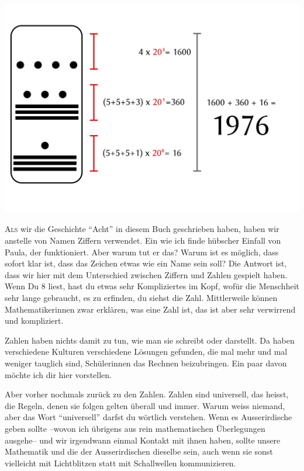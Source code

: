 ﻿
\thispagestyle{empty}
\begin{center}
\includegraphics[width=\textwidth]{./bilder/Maya1976.png}
\end{center}
\vspace*{\fill}
{\centering\fontsize{50}{48} \color{farbe}\par}
\newpage
\lettrine[lines=3, lhang=.2, loversize=.25, lraise=0.05, findent=0.1em,nindent=0em]{A}{ls} wir die Geschichte \enquote{Acht} in diesem Buch geschrieben haben, haben wir anstelle von Namen Ziffern verwendet. Ein wie ich finde hübscher Einfall von Paula, der funktioniert. Aber warum tut er das? Warum ist es möglich, dass sofort klar ist, dass das Zeichen  etwas wie ein Name sein soll? Die Antwort ist, dass wir hier mit dem Unterschied zwischen Ziffern und Zahlen gespielt haben. Wenn Du 8 liest, hast du etwas sehr Kompliziertes im Kopf, wofür die Menschheit sehr lange gebraucht, es zu erfinden, du siehst die Zahl. Mittlerweile können Mathematikerinnen zwar erklären, was eine Zahl ist, das ist aber sehr verwirrend und kompliziert.

Zahlen haben nichts damit zu tun, wie man sie schreibt oder darstellt. Da haben verschiedene Kulturen verschiedene Lösungen gefunden, die mal mehr und mal weniger tauglich sind, Schülerinnen das Rechnen beizubringen. Ein paar davon möchte ich dir hier vorstellen.

Aber vorher nochmals zurück zu den Zahlen. Zahlen sind universell, das heisst, die Regeln, denen sie folgen gelten überall und immer. Warum weiss niemand, aber das Wort \enquote{universell} darfst du wörtlich verstehen. Wenn es Ausserirdische geben sollte --wovon ich übrigens aus rein mathematischen Überlegungen ausgehe-- und wir irgendwann einmal Kontakt mit ihnen haben, sollte unsere Mathematik und die der Ausserirdischen dieselbe sein, auch wenn sie sonst vielleicht mit Lichtblitzen statt mit Schallwellen kommunizieren.

